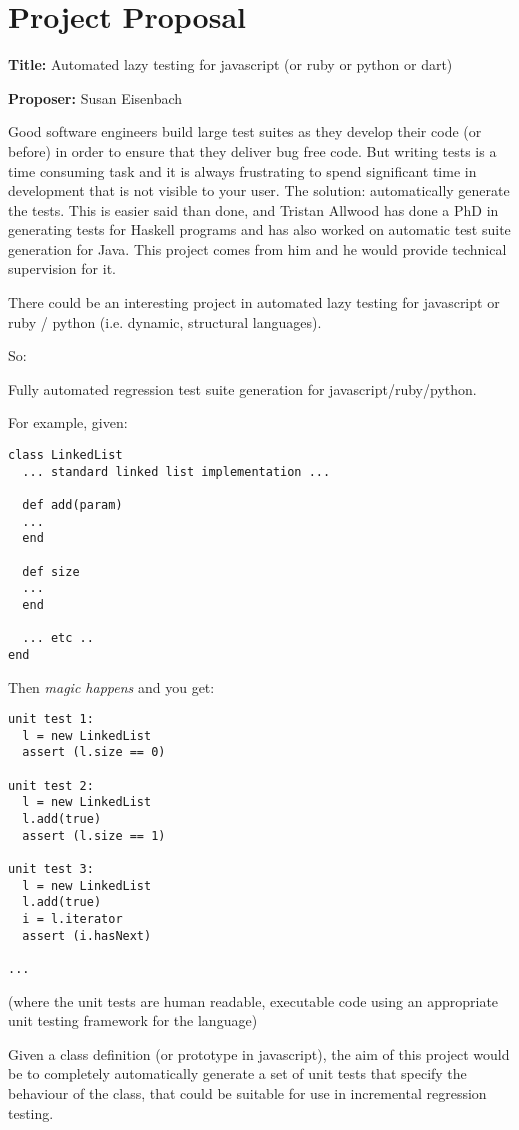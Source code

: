 \appendix
\chapter{Project Proposal}
\label{appx:proposal}
\textbf{Title:} Automated lazy testing for javascript (or ruby or python or
dart)

\textbf{Proposer:} Susan Eisenbach

Good software engineers build large test suites as they develop their code (or before) in order to ensure that they deliver bug free code. But writing tests is a time consuming task and it is always frustrating to spend significant time in development that is not visible to your user. The solution: automatically generate the tests. This is easier said than done, and Tristan Allwood has done a PhD in generating tests for Haskell programs and has also worked on automatic test suite generation for Java. This project comes from him and he would provide technical supervision for it.

There could be an interesting project in automated lazy testing for
javascript or ruby / python (i.e. dynamic, structural languages).



So:

Fully automated regression test suite generation for
javascript/ruby/python.

For example, given:
\begin{verbatim}
class LinkedList
  ... standard linked list implementation ...

  def add(param)
  ...
  end

  def size
  ...
  end

  ... etc ..
end
\end{verbatim}

Then \emph{magic happens} and you get:

\begin{verbatim}
unit test 1:
  l = new LinkedList
  assert (l.size == 0)

unit test 2:
  l = new LinkedList
  l.add(true)
  assert (l.size == 1)

unit test 3:
  l = new LinkedList
  l.add(true)
  i = l.iterator
  assert (i.hasNext)

...
\end{verbatim}

(where the unit tests are human readable, executable code using an
appropriate unit testing framework for the language)

Given a class definition (or prototype in javascript), the aim of this
project would be to completely automatically generate a set of unit
tests that specify the behaviour of the class, that could be suitable
for use in incremental regression testing.

